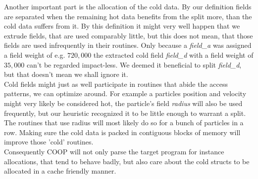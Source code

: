 Another important part is the allocation of the cold data. By our definition fields are separated when the remaining hot data benefits from the split more, than the cold data suffers from it. By this definition it might very well happen that we extrude fields, that are used comparably little, but this does not mean, that those fields are used infrequently in their routines. Only because a \textit{field\_a} was assigned a field weight of e.g. $720,000$ the extracted cold field \textit{field\_d} with a field weight of $35,000$ can't be regarded impact-less. We deemed it beneficial to split \textit{field\_d}, but that doesn't mean we shall ignore it.\\
Cold fields might just as well participate in routines that abide the access patterns, we can optimize around. For example a particles position and velocity might very likely be considered hot, the particle's field \textit{radius} will also be used frequently, but our heuristic recognized it to be little enough to warrant a split. The routines that use radius will most likely do so for a bunch of particles in a row. Making sure the cold data is packed in contiguous blocks of memory will improve those 'cold' routines.\\
Consequently COOP will not only parse the target program for instance allocations, that tend to behave badly, but also care about the cold structs to be allocated in a cache friendly manner.

